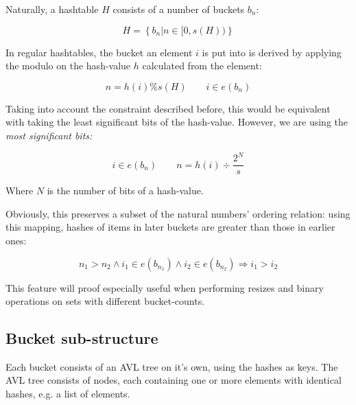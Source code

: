        Naturally, a hashtable $H$ consists of a number of buckets $b_n$:

        \begin{equation}
            H = \left\{ b_n | n \in [0, s(H)) \right\}
        \end{equation}

        In regular hashtables, the bucket an element $i$ is put into is derived
        by applying the modulo on the hash-value $h$ calculated from the
        element:

        \begin{equation}
            n = h(i) \% s(H) \qquad i \in e(b_n)
        \end{equation}

        Taking into account the constraint described before, this would be
        equivalent with taking the least significant bits of the hash-value.
        However, we are using the \em most\em{} significant bits:

        \begin{equation}
            i \in e(b_n) \qquad n = h(i) \div \frac{2^N}{s}
        \end{equation}

        Where $N$ is the number of bits of a hash-value.
        
        Obviously, this preserves a subset of the natural numbers' ordering
        relation: using this mapping, hashes of items in later buckets are
        greater than those in earlier ones:

        \begin{equation}
            n_1 > n_2 \land i_1 \in e(b_{n_1}) \land i_2 \in e(b_{n_2})
            \Rightarrow i_1 > i_2
        \end{equation}

        This feature will proof especially useful when performing resizes and
        binary operations on sets with different bucket-counts.

    \subsection{Bucket sub-structure}

        Each bucket consists of an AVL tree on it's own, using the hashes as
        keys.
        The AVL tree consists of nodes, each containing one or more elements
        with identical hashes, e.g. a list of elements.


